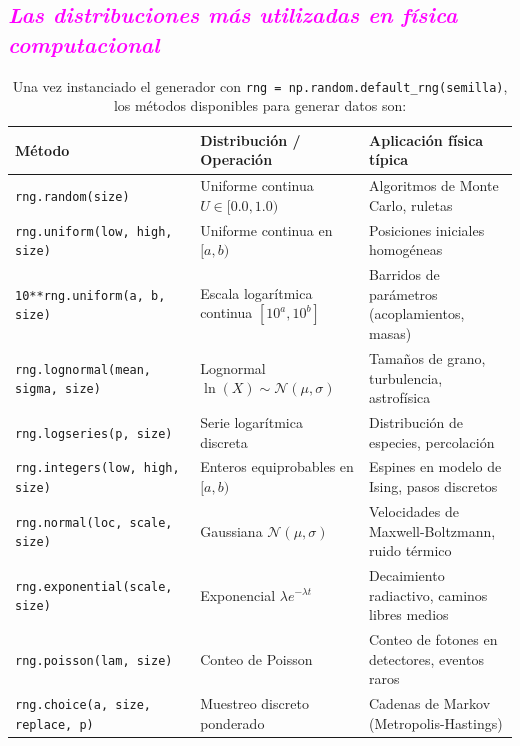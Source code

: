 \documentclass[12pt]{article}
\begin{document}
\subsection*{\textcolor{magenta}{\textit{Las distribuciones más utilizadas en física computacional}}} 

\begin{table}[htbp]
\centering
\small
\caption{Una vez instanciado el generador con \texttt{rng = np.random.default\_rng(semilla)}, los métodos disponibles para generar datos son:}
\label{tab:numpy_distribuciones}
\begin{tabularx}{\textwidth}{l p{4.2cm} X}
\hline
\textbf{Método} & \textbf{Distribución / Operación} & \textbf{Aplicación física típica} \\
\hline
\texttt{rng.random(size)} & Uniforme continua $U \in [0.0, 1.0)$ & Algoritmos de Monte Carlo, ruletas \\
\texttt{rng.uniform(low, high, size)} & Uniforme continua en $[a, b)$ & Posiciones iniciales homogéneas \\
\texttt{10**rng.uniform(a, b, size)} & Escala logarítmica continua $[10^a, 10^b]$ & Barridos de parámetros (acoplamientos, masas) \\
\texttt{rng.lognormal(mean, sigma, size)} & Lognormal $\ln(X) \sim \mathcal{N}(\mu, \sigma)$ & Tamaños de grano, turbulencia, astrofísica \\
\texttt{rng.logseries(p, size)} & Serie logarítmica discreta & Distribución de especies, percolación \\
\texttt{rng.integers(low, high, size)} & Enteros equiprobables en $[a, b)$ & Espines en modelo de Ising, pasos discretos \\
\texttt{rng.normal(loc, scale, size)} & Gaussiana $\mathcal{N}(\mu, \sigma)$ & Velocidades de Maxwell-Boltzmann, ruido térmico \\
\texttt{rng.exponential(scale, size)} & Exponencial $\lambda e^{-\lambda t}$ & Decaimiento radiactivo, caminos libres medios \\
\texttt{rng.poisson(lam, size)} & Conteo de Poisson & Conteo de fotones en detectores, eventos raros \\
\texttt{rng.choice(a, size, replace, p)} & Muestreo discreto ponderado & Cadenas de Markov (Metropolis-Hastings) \\
\hline
\end{tabularx}
\end{table}
\end{document}
